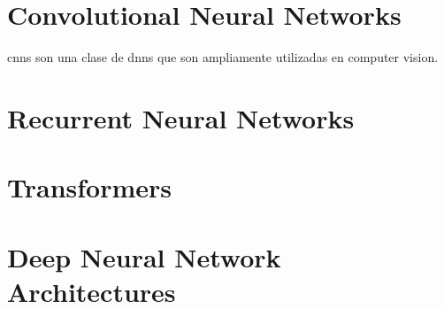 \section{Convolutional Neural Networks}
\label{sec:conv-neur-netw}

\glspl{cnn} son una clase de \glspl{dnn} que son ampliamente utilizadas en
computer vision.


\section{Recurrent Neural Networks}
\label{sec:recurr-neur-netw}


\section{Transformers}
\label{sec:transformers}


\section{Deep Neural Network Architectures}
